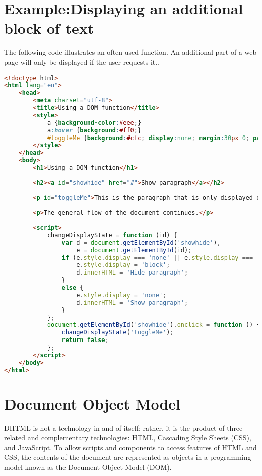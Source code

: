 \chapter{Example:Displaying an additional block of text}

The following code illustrates an often-used function. An additional part of a web page will only be displayed if the user requests it..

\begin{lstlisting}[language=HTML]
<!doctype html>
<html lang="en">
    <head>
        <meta charset="utf-8">
        <title>Using a DOM function</title>
        <style>
            a {background-color:#eee;}
            a:hover {background:#ff0;}
            #toggleMe {background:#cfc; display:none; margin:30px 0; padding:1em;}
        </style>
    </head>
    <body>
        <h1>Using a DOM function</h1>
 
        <h2><a id="showhide" href="#">Show paragraph</a></h2>
 
        <p id="toggleMe">This is the paragraph that is only displayed on request.</p>
 
        <p>The general flow of the document continues.</p>
 
        <script>
            changeDisplayState = function (id) {
                var d = document.getElementById('showhide'),
                    e = document.getElementById(id);
                if (e.style.display === 'none' || e.style.display === '') {
                    e.style.display = 'block';
                    d.innerHTML = 'Hide paragraph';
                }
                else {
                    e.style.display = 'none';
                    d.innerHTML = 'Show paragraph';
                }
            };
            document.getElementById('showhide').onclick = function () {
                changeDisplayState('toggleMe');
                return false;
            };
        </script>
    </body>
</html>
\end{lstlisting}


\chapter{Document Object Model}

DHTML is not a technology in and of itself; rather, it is the product of three related and complementary technologies: HTML, Cascading Style Sheets (CSS), and JavaScript. To allow scripts and components to access features of HTML and CSS, the contents of the document are represented as objects in a programming model known as the Document Object Model (DOM).


